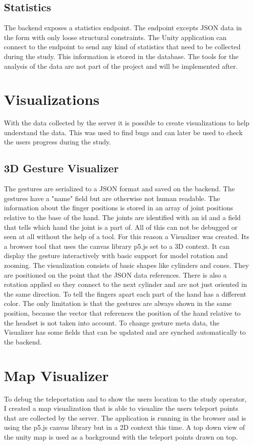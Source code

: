 \subsection{Statistics}
The backend exposes a statistics endpoint. The endpoint excepts JSON data in the form with only loose structural constraints. The Unity application can connect to the endpoint to send any kind of statistics that need to be collected during the study. This information is stored in the database. The tools for the analysis of the data are not part of the project and will be implemented after.  


\section{Visualizations}
With the data collected by the server it is possible to create visualizations to help understand the data. This was used to find bugs and can later be used to check the users progress during the study.

\subsection{3D Gesture Visualizer}
The gestures are serialized to a JSON format and saved on the backend. The gestures have a "name" field but are otherwise not human readable. The information about the finger positions is stored in an array of joint positions relative to the base of the hand. The joints are identified with an id and a field that tells which hand the joint is a part of. All of this can not be debugged or seen at all without the help of a tool. For this reason a Visualizer was created. Its a browser tool that uses the canvas library p5.js set to a 3D context. It can display the gesture interactively with basic support for model rotation and zooming. The visualization consists of basic shapes like cylinders and cones. They are positioned on the point that the JSON data references. There is also a rotation applied so they connect to the next cylinder and are not just oriented in the same direction. To tell the fingers apart each part of the hand has a different color. The only limitation is that the gestures are always shown in the same position, because the vector that references the position of the hand relative to the headset is not taken into account. To change gesture meta data, the Visualizer has some fields that can be updated and are synched automatically to the backend.


\section{Map Visualizer}
To debug the teleportation and to show the users location to the study operator, I created a map visualization that is able to visualize the users teleport points that are collected by the server. The application is running in the browser and is using the p5.js canvas library but in a 2D context this time. A top down view of the unity map is used as a background with the teleport points drawn on top.
